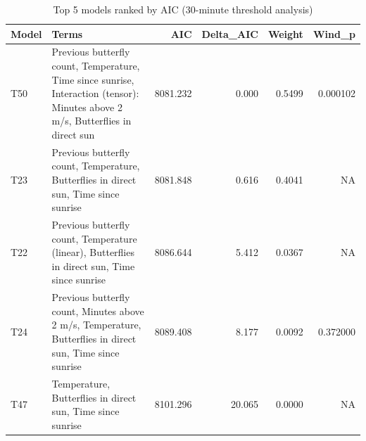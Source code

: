 \begin{table}

\caption{Top 5 models ranked by AIC (30-minute threshold analysis)}
\centering
\begin{tabular}[t]{llrrrr}
\toprule
Model & Terms & AIC & Delta_AIC & Weight & Wind_p\\
\midrule
T50 & Previous butterfly count, Temperature, Time since sunrise, Interaction (tensor): Minutes above 2 m/s, Butterflies in direct sun & 8081.232 & 0.000 & 0.5499 & 0.000102\\
T23 & Previous butterfly count, Temperature, Butterflies in direct sun, Time since sunrise & 8081.848 & 0.616 & 0.4041 & NA\\
T22 & Previous butterfly count, Temperature (linear), Butterflies in direct sun, Time since sunrise & 8086.644 & 5.412 & 0.0367 & NA\\
T24 & Previous butterfly count, Minutes above 2 m/s, Temperature, Butterflies in direct sun, Time since sunrise & 8089.408 & 8.177 & 0.0092 & 0.372000\\
T47 & Temperature, Butterflies in direct sun, Time since sunrise & 8101.296 & 20.065 & 0.0000 & NA\\
\bottomrule
\end{tabular}
\end{table}
